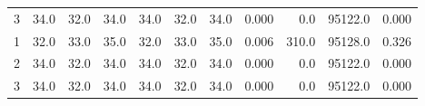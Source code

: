 \begin{tabular}{lrrrrrrrrrr}
3 &                34.0 &                32.0 &                 34.0 &          34.0 &            32.0 &             34.0 &                                         0.000 &                      0.0 &                     95122.0 &                         0.000 \\
1 &                32.0 &                33.0 &                 35.0 &          32.0 &            33.0 &             35.0 &                                         0.006 &                    310.0 &                     95128.0 &                         0.326 \\
2 &                34.0 &                32.0 &                 34.0 &          34.0 &            32.0 &             34.0 &                                         0.000 &                      0.0 &                     95122.0 &                         0.000 \\
3 &                34.0 &                32.0 &                 34.0 &          34.0 &            32.0 &             34.0 &                                         0.000 &                      0.0 &                     95122.0 &                         0.000 \\
\bottomrule
\end{tabular}
